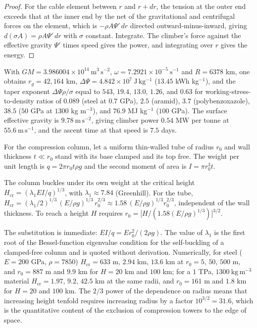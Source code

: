 \begin{proof}
For the cable element between $r$ and $r+dr$, the tension at the outer end exceeds that at the inner end by the net of the gravitational and centrifugal forces on the element, which is $-\rho A\Psi'\,dr$ directed outward-minus-inward, giving $d(\sigma A)=\rho A\Psi'\,dr$ with $\sigma$ constant. Integrate. The climber's force against the effective gravity $\Psi'$ times speed gives the power, and integrating over $r$ gives the energy.
\end{proof}

With $GM=3.986004\times10^{14}\ \mathrm{m^3\,s^{-2}}$, $\omega=7.2921\times10^{-5}\ \mathrm{s^{-1}}$ and $R=6378$ km, one obtains $r_g=42{,}164$ km, $\Delta\Psi=4.842\times10^7\ \mathrm{J\,kg^{-1}}$ ($13.45$ kWh kg$^{-1}$), and the taper exponent $\Delta\Psi\rho/\sigma$ equal to $543$, $19.4$, $13.0$, $1.26$, and $0.63$ for working-stress-to-density ratios of $0.089$ (steel at $0.7$ GPa), $2.5$ (aramid), $3.7$ (polybenzoxazole), $38.5$ ($50$ GPa at $1300$ kg m$^{-3}$), and $76.9$ MJ kg$^{-1}$ ($100$ GPa). The surface effective gravity is $9.78\ \mathrm{m\,s^{-2}}$, giving climber power $0.54$ MW per tonne at $55.6\ \mathrm{m\,s^{-1}}$, and the ascent time at that speed is $7.5$ days.

For the compression column, let a uniform thin-walled tube of radius $r_0$ and wall thickness $t\ll r_0$ stand with its base clamped and its top free. The weight per unit length is $q=2\pi r_0t\rho g$ and the second moment of area is $I=\pi r_0^3t$.

\begin{proposition}
The column buckles under its own weight at the critical height $H_{\mathrm{cr}}=(\lambda_1EI/q)^{1/3}$, with $\lambda_1\approx7.84$ (Greenhill). For the tube, $H_{\mathrm{cr}}=(\lambda_1/2)^{1/3}\,(E/\rho g)^{1/3}\,r_0^{2/3}\approx1.58\,(E/\rho g)^{1/3}r_0^{2/3}$, independent of the wall thickness. To reach a height $H$ requires $r_0=\big[H/(1.58(E/\rho g)^{1/3})\big]^{3/2}$.
\end{proposition}

The substitution is immediate: $EI/q=Er_0^2/(2\rho g)$. The value of $\lambda_1$ is the first root of the Bessel-function eigenvalue condition for the self-buckling of a clamped-free column and is quoted without derivation. Numerically, for steel ($E=200$ GPa, $\rho=7850$) $H_{\mathrm{cr}}=633$ m, $2.94$ km, $13.6$ km at $r_0=5$, $50$, $500$ m, and $r_0=887$ m and $9.9$ km for $H=20$ km and $100$ km; for a $1$ TPa, $1300\ \mathrm{kg\,m^{-3}}$ material $H_{\mathrm{cr}}=1.97$, $9.2$, $42.5$ km at the same radii, and $r_0=161$ m and $1.8$ km for $H=20$ and $100$ km. The $2/3$ power of the dependence on radius means that increasing height tenfold requires increasing radius by a factor $10^{3/2}=31.6$, which is the quantitative content of the exclusion of compression towers to the edge of space.

